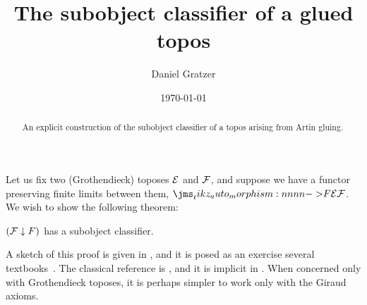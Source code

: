 \documentclass{amsart}
\title{The subobject classifier of a glued topos}
\author{Daniel Gratzer}
\date{\today}
\begin{document}
\begin{abstract}
  An explicit construction of the subobject classifier of a topos arising from Artin gluing.
\end{abstract}

\maketitle

Let us fix two (Grothendieck) toposes $\mathcal{E}$ and $\mathcal{F}$, and suppose we have a functor preserving
finite limits between them, $\Mor[F]{\EE}{\FF}$. We wish to show the following theorem:
\begin{theorem}
  \label{thm:subobject-classifier}
  $(\mathcal{F} \downarrow F)$ has a subobject classifier.
\end{theorem}
A sketch of this proof is given in \textcite[A2.1.12]{johnstone:2002}, and it is posed as an
exercise several textbooks~\parencite{maclane-moerdijk:1992,taylor:1999}. The classical reference is
\textcite{sga:4}, and it is implicit in \eg{} \textcite{wraith:1974}. When concerned only with
Grothendieck toposes, it is perhaps simpler to work only with the Giraud axioms.
\end{document}
